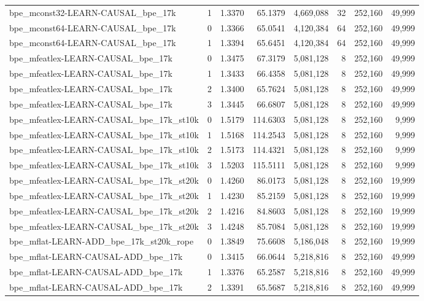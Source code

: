 \begin{tabular}{lrrrrrrr}
bpe\_mconst32-LEARN-CAUSAL\_bpe\_17k & 1 & 1.3370 & 65.1379 & 4,669,088 & 32 & 252,160 & 49,999 \\
bpe\_mconst64-LEARN-CAUSAL\_bpe\_17k & 0 & 1.3366 & 65.0541 & 4,120,384 & 64 & 252,160 & 49,999 \\
bpe\_mconst64-LEARN-CAUSAL\_bpe\_17k & 1 & 1.3394 & 65.6451 & 4,120,384 & 64 & 252,160 & 49,999 \\
bpe\_mfeatlex-LEARN-CAUSAL\_bpe\_17k & 0 & 1.3475 & 67.3179 & 5,081,128 & 8 & 252,160 & 49,999 \\
bpe\_mfeatlex-LEARN-CAUSAL\_bpe\_17k & 1 & 1.3433 & 66.4358 & 5,081,128 & 8 & 252,160 & 49,999 \\
bpe\_mfeatlex-LEARN-CAUSAL\_bpe\_17k & 2 & 1.3400 & 65.7624 & 5,081,128 & 8 & 252,160 & 49,999 \\
bpe\_mfeatlex-LEARN-CAUSAL\_bpe\_17k & 3 & 1.3445 & 66.6807 & 5,081,128 & 8 & 252,160 & 49,999 \\
bpe\_mfeatlex-LEARN-CAUSAL\_bpe\_17k\_st10k & 0 & 1.5179 & 114.6303 & 5,081,128 & 8 & 252,160 & 9,999 \\
bpe\_mfeatlex-LEARN-CAUSAL\_bpe\_17k\_st10k & 1 & 1.5168 & 114.2543 & 5,081,128 & 8 & 252,160 & 9,999 \\
bpe\_mfeatlex-LEARN-CAUSAL\_bpe\_17k\_st10k & 2 & 1.5173 & 114.4321 & 5,081,128 & 8 & 252,160 & 9,999 \\
bpe\_mfeatlex-LEARN-CAUSAL\_bpe\_17k\_st10k & 3 & 1.5203 & 115.5111 & 5,081,128 & 8 & 252,160 & 9,999 \\
bpe\_mfeatlex-LEARN-CAUSAL\_bpe\_17k\_st20k & 0 & 1.4260 & 86.0173 & 5,081,128 & 8 & 252,160 & 19,999 \\
bpe\_mfeatlex-LEARN-CAUSAL\_bpe\_17k\_st20k & 1 & 1.4230 & 85.2159 & 5,081,128 & 8 & 252,160 & 19,999 \\
bpe\_mfeatlex-LEARN-CAUSAL\_bpe\_17k\_st20k & 2 & 1.4216 & 84.8603 & 5,081,128 & 8 & 252,160 & 19,999 \\
bpe\_mfeatlex-LEARN-CAUSAL\_bpe\_17k\_st20k & 3 & 1.4248 & 85.7084 & 5,081,128 & 8 & 252,160 & 19,999 \\
bpe\_mflat-LEARN-ADD\_bpe\_17k\_st20k\_rope & 0 & 1.3849 & 75.6608 & 5,186,048 & 8 & 252,160 & 19,999 \\
bpe\_mflat-LEARN-CAUSAL-ADD\_bpe\_17k & 0 & 1.3415 & 66.0644 & 5,218,816 & 8 & 252,160 & 49,999 \\
bpe\_mflat-LEARN-CAUSAL-ADD\_bpe\_17k & 1 & 1.3376 & 65.2587 & 5,218,816 & 8 & 252,160 & 49,999 \\
bpe\_mflat-LEARN-CAUSAL-ADD\_bpe\_17k & 2 & 1.3391 & 65.5687 & 5,218,816 & 8 & 252,160 & 49,999 \\

\end{tabular}
